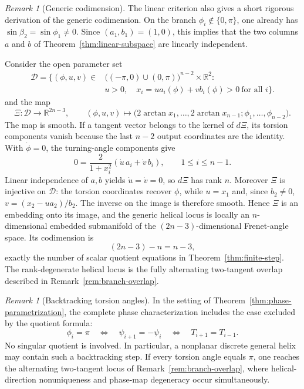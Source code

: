 \documentclass[10pt,a4paper]{amsart}
\theoremstyle{definition}
\theoremstyle{remark}
\newtheorem{remark}[theorem]{Remark}
\numberwithin{equation}{section}
\begin{document}
\begin{remark}[Generic codimension]\label{rem:codimension}
The linear criterion also gives a short rigorous derivation of the generic codimension. On the branch $\phi_i\notin\{0,\pi\}$, one already has $\sin\beta_2=\sin\phi_1\ne0$. Since $(a_1,b_1)=(1,0)$, this implies that the two columns $a$ and $b$ of Theorem~\ref{thm:linear-subspace} are linearly independent.

Consider the open parameter set
\[
\begin{aligned}
\mathcal D=\bigl\{(\phi,u,v)\in{}&
\bigl(( -\pi,0)\cup(0,\pi)\bigr)^{n-2}\times\mathbb R^2:\\
&u>0,\quad x_i=ua_i(\phi)+vb_i(\phi)>0
\ \text{for all }i\bigr\}.
\end{aligned}
\]
and the map
\[
\Xi:\mathcal D\longrightarrow\mathbb R^{2n-3},\qquad
(\phi,u,v)\longmapsto
\bigl(2\arctan x_1,\ldots,2\arctan x_{n-1};\phi_1,\ldots,\phi_{n-2}\bigr).
\]
The map is smooth. If a tangent vector belongs to the kernel of $d\Xi$, its torsion components vanish because the last $n-2$ output coordinates are the identity. With $\dot\phi=0$, the turning-angle components give
\[
0=\frac{2}{1+x_i^2}(\dot u\,a_i+\dot v\,b_i),
\qquad 1\le i\le n-1.
\]
Linear independence of $a,b$ yields $\dot u=\dot v=0$, so $d\Xi$ has rank $n$. Moreover $\Xi$ is injective on $\mathcal D$: the torsion coordinates recover $\phi$, while $u=x_1$ and, since $b_2\ne0$, $v=(x_2-u a_2)/b_2$. The inverse on the image is therefore smooth. Hence $\Xi$ is an embedding onto its image, and the generic helical locus is locally an $n$-dimensional embedded submanifold of the $(2n-3)$-dimensional Frenet-angle space. Its codimension is
\[
(2n-3)-n=n-3,
\]
exactly the number of scalar quotient equations in Theorem~\ref{thm:finite-step}. The rank-degenerate helical locus is the fully alternating two-tangent overlap described in Remark~\ref{rem:branch-overlap}.
\end{remark}

\begin{remark}[Backtracking torsion angles]\label{rem:pi-branch}
In the setting of Theorem~\ref{thm:phase-parametrization}, the complete phase characterization includes the case excluded by the quotient formula:
\[
\phi_i=\pi
\quad\Longleftrightarrow\quad
\psi_{i+1}=-\psi_i
\quad\Longleftrightarrow\quad
T_{i+1}=T_{i-1}.
\]
No singular quotient is involved. In particular, a nonplanar discrete general helix may contain such a backtracking step. If every torsion angle equals $\pi$, one reaches the alternating two-tangent locus of Remark~\ref{rem:branch-overlap}, where helical-direction nonuniqueness and phase-map degeneracy occur simultaneously.
\end{remark}
\end{document}
